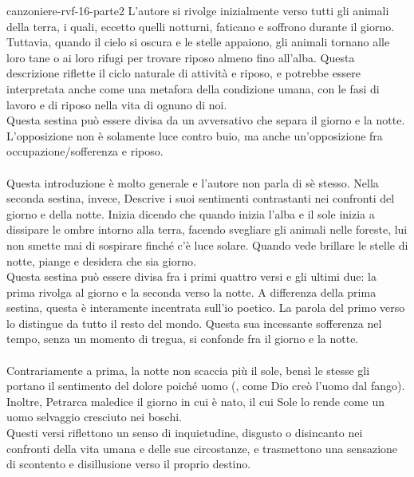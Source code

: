\documentclass[preview]{standalone}
\begin{document}
\begin{snippet}{canzoniere-rvf-16-parte2}
     L'autore si rivolge inizialmente verso tutti gli animali della terra,
    i quali, eccetto quelli notturni, faticano e soffrono durante il giorno.
    Tuttavia, quando il cielo si oscura e le stelle appaiono,
    gli animali tornano alle loro tane o ai loro rifugi per trovare
    riposo almeno fino all'alba.
    Questa descrizione riflette il ciclo naturale di attività e riposo,
    e potrebbe essere interpretata anche come una metafora della condizione umana,
    con le fasi di lavoro e di riposo nella vita di ognuno di noi. \\
    Questa sestina può essere divisa da un  avversativo che separa il giorno e la notte.
    L'opposizione non è solamente luce contro buio, ma anche un'opposizione fra occupazione/sofferenza e riposo.
    \\\\
     Questa introduzione è molto generale e l'autore non parla di sè stesso.
    Nella seconda sestina, invece, Descrive i suoi sentimenti contrastanti nei confronti
    del giorno e della notte.
    Inizia dicendo che quando inizia l'alba e il sole inizia a dissipare
    le ombre intorno alla terra, facendo svegliare gli animali nelle foreste,
    lui non smette mai di sospirare finché c'è luce solare.
    Quando vede brillare le stelle di notte, piange e desidera che sia giorno. \\
    Questa sestina può essere divisa fra i primi quattro versi e gli ultimi due:
    la prima rivolga al giorno e la seconda verso la notte.
    A differenza della prima sestina, questa è interamente incentrata sull'io poetico.
    La parola  del primo verso lo distingue da tutto il resto del mondo.
    Questa sua incessante sofferenza nel tempo, senza un momento di tregua,
    si confonde fra il giorno e la notte.
    \\\\
     Contrariamente a prima, la notte non scaccia più il sole, bensì
    le stesse gli portano il sentimento del dolore poiché uomo (,
    come Dio creò l'uomo dal fango).
    Inoltre, Petrarca maledice il giorno in cui è nato, il cui Sole lo rende come un uomo selvaggio cresciuto nei boschi.
    \\
    Questi versi riflettono un senso di inquietudine,
    disgusto o disincanto nei confronti della vita umana e delle sue circostanze,
    e trasmettono una sensazione di scontento e disillusione verso il proprio destino.

\end{snippet}
\end{document}
